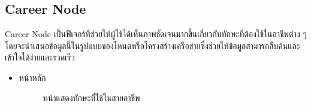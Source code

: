 \subsection {Career Node}
Career Node เป็นฟีเจอร์ที่ช่วยให้ผู้ใช้ได้เห็นภาพชัดเจนมากขึ้นเกี่ยวกับทักษะที่ต้องใช้ในอาชีพต่าง ๆ โดยจะนำเสนอข้อมูลนี้ในรูปแบบของโหนดหรือโครงสร้างเครือข่ายซึ่งช่วยให้ข้อมูลสามารถสืบค้นและเข้าใจได้ง่ายและรวดเร็ว\begin{itemize}
    \item หน้าหลัก
    \begin{figure}[H]\centering
    \setlength{\fboxrule}{0.2mm} %
    \setlength{\fboxsep}{0.5cm}
  \caption{\centering หน้าแสดงทักษะที่ใช้ในสายอาชีพ}\label{fig:wireframe4_1}
  \end{figure}
\end{itemize}

